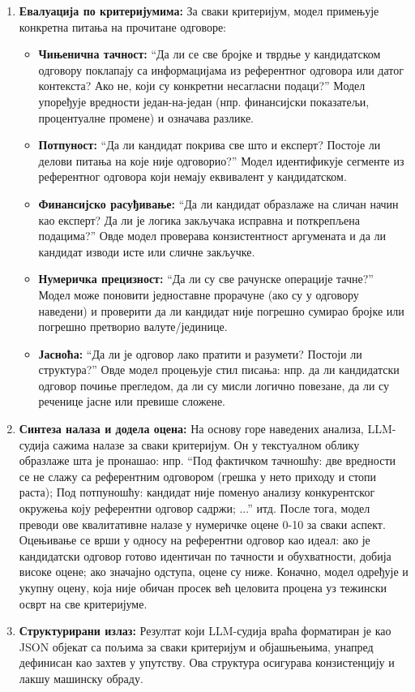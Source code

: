 \begin{enumerate}
    \item \textbf{Евалуација по критеријумима:} За сваки критеријум, модел примењује конкретна питања на прочитане одговоре:
    \begin{itemize}
        \item \textbf{Чињенична тачност:} ``Да ли се све бројке и тврдње у кандидатском одговору поклапају са информацијама из референтног одговора или датог контекста? Ако не, који су конкретни несагласни подаци?'' Модел упоређује вредности један-на-један (нпр. финансијски показатељи, процентуалне промене) и означава разлике.
        \item \textbf{Потпуност:} ``Да ли кандидат покрива све што и експерт? Постоје ли делови питања на које није одговорио?'' Модел идентификује сегменте из референтног одговора који немају еквивалент у кандидатском.
        \item \textbf{Финансијско расуђивање:} ``Да ли кандидат образлаже на сличан начин као експерт? Да ли је логика закључака исправна и поткрепљена подацима?'' Овде модел проверава конзистентност аргумената и да ли кандидат изводи исте или сличне закључке.
        \item \textbf{Нумеричка прецизност:} ``Да ли су све рачунске операције тачне?'' Модел може поновити једноставне прорачуне (ако су у одговору наведени) и проверити да ли кандидат није погрешно сумирао бројке или погрешно претворио валуте/јединице.
        \item \textbf{Јасноћа:} ``Да ли је одговор лако пратити и разумети? Постоји ли структура?'' Овде модел процењује стил писања: нпр. да ли кандидатски одговор почиње прегледом, да ли су мисли логично повезане, да ли су реченице јасне или превише сложене.
    \end{itemize}

    \item \textbf{Синтеза налаза и додела оцена:} На основу горе наведених анализа, LLM-судија сажима налазе за сваки критеријум. Он у текстуалном облику образлаже шта је пронашао: нпр. ``Под фактичком тачношћу: две вредности се не слажу са референтним одговором (грешка у нето приходу и стопи раста); Под потпуношћу: кандидат није поменуо анализу конкурентског окружења коју референтни одговор садржи; ...'' итд. После тога, модел преводи ове квалитативне налазе у нумеричке оцене 0-10 за сваки аспект. Оцењивање се врши у односу на референтни одговор као идеал: ако је кандидатски одговор готово идентичан по тачности и обухватности, добија високе оцене; ако значајно одступа, оцене су ниже. Коначно, модел одређује и укупну оцену, која није обичан просек већ целовита процена уз тежински осврт на све критеријуме.

    \item \textbf{Структурирани излаз:} Резултат који LLM-судија враћа форматиран је као JSON објекат са пољима за сваки критеријум и објашњењима, унапред дефинисан као захтев у упутству. Ова структура осигурава конзистенцију и лакшу машинску обраду.
\end{enumerate}

